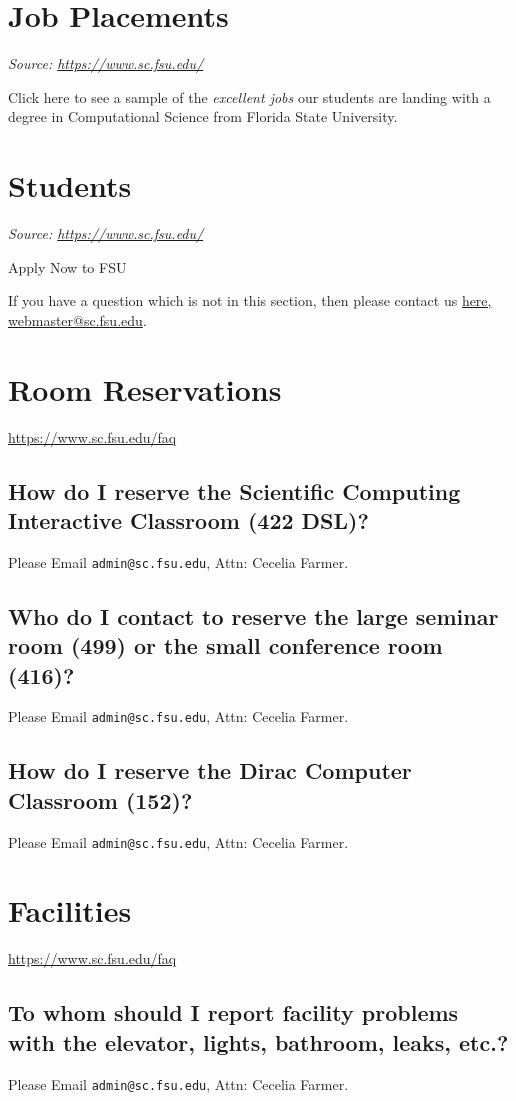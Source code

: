 \documentclass[12pt,a4paper]{article}
\begin{document}
\section{Job Placements}
\textit{Source: \url{https://www.sc.fsu.edu/}}

Click here to see a sample of the \textit{excellent jobs} our students are landing with a degree in Computational Science from Florida State University.

\section{Students}
\textit{Source: \url{https://www.sc.fsu.edu/}}

Apply Now to FSU

If you have a question which is not in this section, then please contact us \href{mailto:webmaster@sc.fsu.edu}{here, webmaster@sc.fsu.edu}.

\section{Room Reservations}
\url{https://www.sc.fsu.edu/faq}
\subsection{How do I reserve the Scientific Computing Interactive Classroom (422 DSL)?}
Please Email \texttt{admin@sc.fsu.edu}, Attn: Cecelia Farmer.

\subsection{Who do I contact to reserve the large seminar room (499) or the small conference room (416)?}
Please Email \texttt{admin@sc.fsu.edu}, Attn: Cecelia Farmer.

\subsection{How do I reserve the Dirac Computer Classroom (152)?}
Please Email \texttt{admin@sc.fsu.edu}, Attn: Cecelia Farmer.

\section{Facilities}
\url{https://www.sc.fsu.edu/faq}
\subsection{To whom should I report facility problems with the elevator, lights, bathroom, leaks, etc.?}
Please Email \texttt{admin@sc.fsu.edu}, Attn: Cecelia Farmer.
\end{document}
